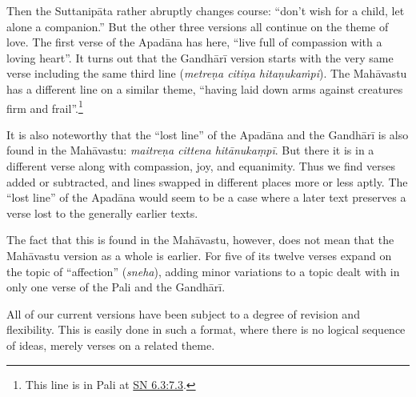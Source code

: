\documentclass[12pt,openany]{book}%
\begin{document}
Then the \textsanskrit{Suttanipāta} rather abruptly changes course: “don’t wish for a child, let alone a companion.” But the other three versions all continue on the theme of love. The first verse of the \textsanskrit{Apadāna} has here, “live full of compassion with a loving heart”. It turns out that the \textsanskrit{Gandhārī} version starts with the very same verse including the same third line (\textit{\textsanskrit{metreṇa} \textsanskrit{citiṇa} \textsanskrit{hitaṇukaṁpi}}). The \textsanskrit{Mahāvastu} has a different line on a similar theme, “having laid down arms against creatures firm and frail”.\footnote{This line is in Pali at \href{https://suttacentral.net/sn6.3/en/sujato\#7.3}{SN 6.3:7.3}. }

It is also noteworthy that the “lost line” of the \textsanskrit{Apadāna} and the \textsanskrit{Gandhārī} is also found in the \textsanskrit{Mahāvastu}: \textit{\textsanskrit{maitreṇa} cittena \textsanskrit{hitānukaṃpī}}. But there it is in a different verse along with compassion, joy, and equanimity. Thus we find verses added or subtracted, and lines swapped in different places more or less aptly. The “lost line” of the \textsanskrit{Apadāna} would seem to be a case where a later text preserves a verse lost to the generally earlier texts.

The fact that this is found in the \textsanskrit{Mahāvastu}, however, does not mean that the \textsanskrit{Mahāvastu} version as a whole is earlier. For five of its twelve verses expand on the topic of “affection” (\textit{sneha}), adding minor variations to a topic dealt with in only one verse of the Pali and the \textsanskrit{Gandhārī}.

All of our current versions have been subject to a degree of revision and flexibility. This is easily done in such a format, where there is no logical sequence of ideas, merely verses on a related theme.
\end{document}

